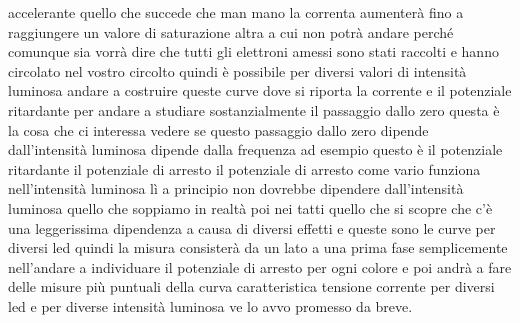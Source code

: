accelerante quello che succede che man mano la correnta aumenterà fino a raggiungere un valore di saturazione altra a cui non potrà andare perché comunque sia vorrà dire che tutti gli elettroni amessi sono stati raccolti e hanno circolato nel vostro circolto quindi è possibile per diversi valori di intensità luminosa andare a costruire queste curve dove si riporta la corrente e il potenziale ritardante per andare a studiare sostanzialmente il passaggio dallo zero questa è la cosa che ci interessa vedere se questo passaggio dallo zero dipende dall'intensità luminosa dipende dalla frequenza ad esempio questo è il potenziale ritardante il potenziale di arresto il potenziale di arresto come vario funziona nell'intensità luminosa lì a principio non dovrebbe dipendere dall'intensità luminosa quello che soppiamo in realtà poi nei tatti quello che si scopre che c'è una leggerissima dipendenza a causa di diversi effetti e queste sono le curve per diversi led quindi la misura consisterà da un lato a una prima fase semplicemente nell'andare a individuare il potenziale di arresto per ogni colore e poi andrà a fare delle misure più puntuali della curva caratteristica tensione corrente per diversi led e per diverse intensità luminosa ve lo avvo promesso da breve.